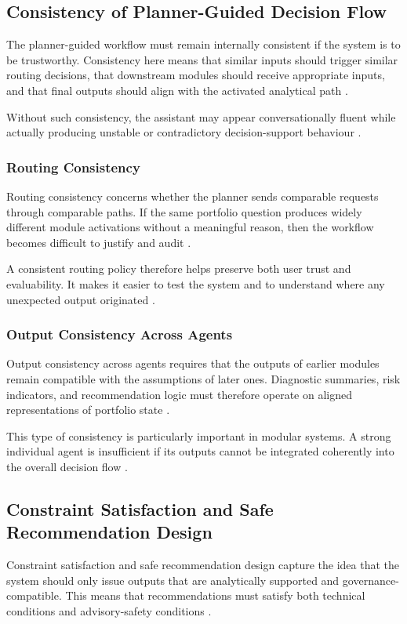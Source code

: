 \documentclass[11pt]{article}
\begin{document}
\subsection{Consistency of Planner-Guided Decision Flow}
The planner-guided workflow must remain internally consistent if the system is to be trustworthy. Consistency here means that similar inputs should trigger similar routing decisions, that downstream modules should receive appropriate inputs, and that final outputs should align with the activated analytical path \cite{wooldridge2009,hayesroth1985}.

Without such consistency, the assistant may appear conversationally fluent while actually producing unstable or contradictory decision-support behaviour \cite{ji2023,wu2023}.

\subsubsection{Routing Consistency}
Routing consistency concerns whether the planner sends comparable requests through comparable paths. If the same portfolio question produces widely different module activations without a meaningful reason, then the workflow becomes difficult to justify and audit \cite{jennings1998,wooldridge2009}.

A consistent routing policy therefore helps preserve both user trust and evaluability. It makes it easier to test the system and to understand where any unexpected output originated \cite{white2000}.

\subsubsection{Output Consistency Across Agents}
Output consistency across agents requires that the outputs of earlier modules remain compatible with the assumptions of later ones. Diagnostic summaries, risk indicators, and recommendation logic must therefore operate on aligned representations of portfolio state \cite{hayesroth1985,hamilton2017}.

This type of consistency is particularly important in modular systems. A strong individual agent is insufficient if its outputs cannot be integrated coherently into the overall decision flow \cite{wooldridge2009,adadi2018}.

\subsection{Constraint Satisfaction and Safe Recommendation Design}
Constraint satisfaction and safe recommendation design capture the idea that the system should only issue outputs that are analytically supported and governance-compatible. This means that recommendations must satisfy both technical conditions and advisory-safety conditions \cite{mifid2014,gdpr2016,aiact2024}.
\end{document}
